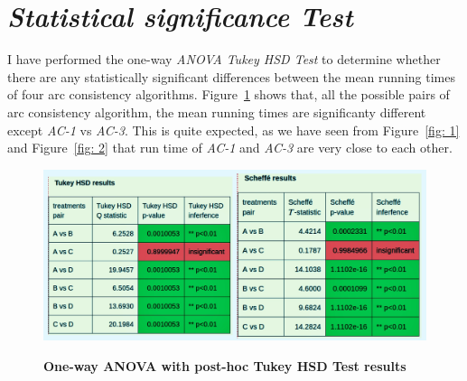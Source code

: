 \documentclass[12pt, english]{article}
\begin{document}
\section{\textit{Statistical significance Test}}
\par
I have performed the one-way \textit{ANOVA Tukey HSD Test} to determine whether there are any statistically significant differences between the mean running times of four arc consistency algorithms. Figure~\ref{fig: 3} shows that, all the possible pairs of arc consistency algorithm, the mean running times are significanty different except \textit{AC-1} vs \textit{AC-3}. This is quite expected, as we have seen from Figure~\ref{fig: 1} and Figure~\ref{fig: 2} that run time of \textit{AC-1} and \textit{AC-3} are very close to each other.

\begin{figure}[ht]
		{\includegraphics[width=\textwidth]{5.jpeg}}
		\caption{\textbf{One-way ANOVA with post-hoc Tukey HSD Test results}}
        \label{fig: 3}
\end{figure}
\end{document}

